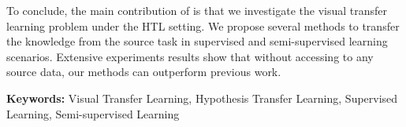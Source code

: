 \documentclass[12pt,twoside]{report}
\numberwithin{figure}{chapter}
\newenvironment{preliminary}%
{\pagestyle{plain}\pagenumbering{roman}}%
{\pagenumbering{arabic}}
\begin{document}
\begin{preliminary}
		To conclude, the main contribution of is that we investigate the visual transfer learning problem under the HTL setting. We propose several methods to transfer the knowledge from the source task in supervised and semi-supervised learning scenarios. Extensive experiments results show that without accessing to any source data, our methods can outperform previous work.
		
		
		\vfill
		\textbf{Keywords:} Visual Transfer Learning, Hypothesis Transfer Learning, Supervised Learning, Semi-supervised Learning
		
		\newpage
		\tableofcontents\newpage
		\newpage
		\listoffigures
		\newpage
		\listoftables\newpage
	\end{preliminary}
	
	
	
	
	
	
	
	
	
	
	{}
	
\end{document}
